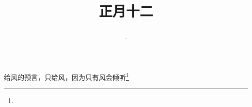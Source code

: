 \title{\date[d=21,m=2,y=2024][year:cn-y,年,month:cn,day:cn,日,·,weekday]·正月十二 }
给风的预言，只给风，因为只有风会倾听\footnote{ }

